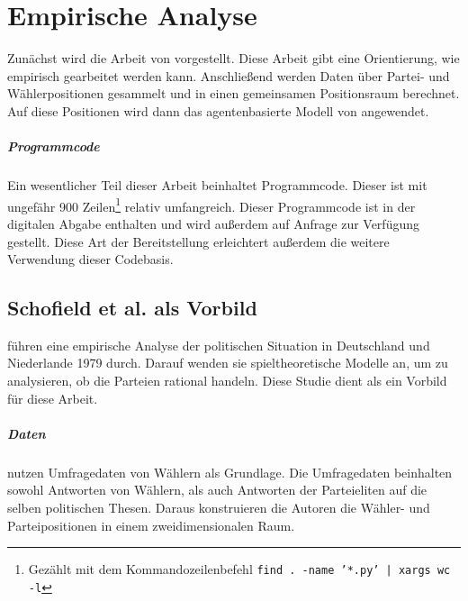 
\chapter{Empirische Analyse}\label{Kap-Empirische-Analyse}

Zunächst wird die Arbeit von \citet{schofield1998germany} vorgestellt.
Diese Arbeit gibt eine Orientierung, wie empirisch gearbeitet werden kann.
Anschließend werden Daten über Partei- und Wählerpositionen gesammelt und in einen gemeinsamen Positionsraum berechnet. Auf diese Positionen wird dann das agentenbasierte Modell von \citet{laver2005policy} angewendet.

\paragraph{Programmcode}
Ein wesentlicher Teil dieser Arbeit beinhaltet Programmcode. Dieser ist mit ungefähr 900 Zeilen\footnote{Gezählt mit dem Kommandozeilenbefehl \texttt{find . -name '*.py' | xargs wc -l}} relativ umfangreich.
Dieser Programmcode ist in der digitalen Abgabe enthalten und wird außerdem auf Anfrage zur Verfügung gestellt.
Diese Art der Bereitstellung erleichtert außerdem die weitere Verwendung dieser Codebasis.

\section{Schofield et al. als Vorbild}

\citet{schofield1998germany} führen eine empirische Analyse der politischen Situation in Deutschland und Niederlande 1979 durch. Darauf wenden sie spieltheoretische Modelle an, um zu analysieren, ob die Parteien rational handeln. Diese Studie dient als ein Vorbild für diese Arbeit.

\paragraph{Daten}
\citet{schofield1998germany} nutzen Umfragedaten von Wählern als Grundlage. Die Umfragedaten beinhalten sowohl Antworten von Wählern, als auch Antworten der Parteieliten auf die selben politischen Thesen. Daraus konstruieren die Autoren die Wähler- und Parteipositionen in einem zweidimensionalen Raum.
\citep[S.\,268-9]{schofield1998germany}


